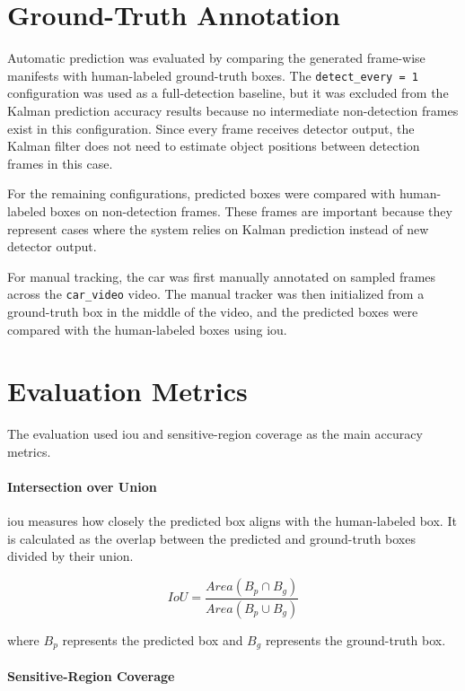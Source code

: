 \section{Ground-Truth Annotation}

Automatic prediction was evaluated by comparing the generated frame-wise manifests with human-labeled ground-truth boxes. The \texttt{detect\_every = 1} configuration was used as a full-detection baseline, but it was excluded from the Kalman prediction accuracy results because no intermediate non-detection frames exist in this configuration. Since every frame receives detector output, the Kalman filter does not need to estimate object positions between detection frames in this case.

For the remaining configurations, predicted boxes were compared with human-labeled boxes on non-detection frames. These frames are important because they represent cases where the system relies on Kalman prediction instead of new detector output.

For manual tracking, the car was first manually annotated on sampled frames across the \texttt{car\_video} video. The manual tracker was then initialized from a ground-truth box in the middle of the video, and the predicted boxes were compared with the human-labeled boxes using \acrshort{iou}.

\section{Evaluation Metrics}

The evaluation used \acrshort{iou} and sensitive-region coverage as the main accuracy metrics.

\paragraph{Intersection over Union}

\acrshort{iou} measures how closely the predicted box aligns with the human-labeled box. It is calculated as the overlap between the predicted and ground-truth boxes divided by their union.

\[
IoU = \frac{Area(B_p \cap B_g)}{Area(B_p \cup B_g)}
\]

where \(B_p\) represents the predicted box and \(B_g\) represents the ground-truth box.

\paragraph{Sensitive-Region Coverage}

